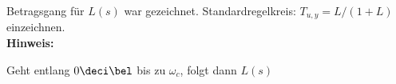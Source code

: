 \begin{question}[section=4,name={Standardregelkreis},difficulty=,type=mdl,tags={}]
	Betragsgang für $L(s)$ war gezeichnet. Standardregelkreis: $T_{u,y} = L/(1+L)$ einzeichnen.
	\\ \textbf{Hinweis:}\\
	
\end{question}
\begin{solution}
	Geht entlang $0\deci\bel$ bis zu $\omega_c$, folgt dann $L(s)$
\end{solution}